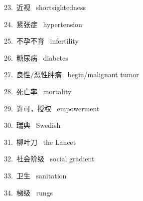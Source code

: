 \documentclass[a4paper, 12pt]{article}
\begin{document}
\begin{multicols}{2}
\begin{flushleft}
23.\ 近视 \ shortsightedness
\end{flushleft}

\begin{flushleft}
24.\ 紧张症 \ hypertension
\end{flushleft}
\end{multicols}

\begin{multicols}{2}
\begin{flushleft}
25.\ 不孕不育 \ infertility
\end{flushleft}

\begin{flushleft}
26.\ 糖尿病 \ diabetes
\end{flushleft}
\end{multicols}

\begin{multicols}{2}
\begin{flushleft}
27.\ 良性/恶性肿瘤 \ begin/malignant tumor
\end{flushleft}

\begin{flushleft}
28.\ 死亡率 \ mortality
\end{flushleft}
\end{multicols}

\begin{multicols}{2}
\begin{flushleft}
29.\ 许可，授权 \ empowerment
\end{flushleft}

\begin{flushleft}
30.\ 瑞典 \ Swedish
\end{flushleft}
\end{multicols}

\begin{multicols}{2}
\begin{flushleft}
31.\ 柳叶刀 \ the Lancet
\end{flushleft}

\begin{flushleft}
32.\ 社会阶级 \ social gradient
\end{flushleft}
\end{multicols}

\begin{multicols}{2}
\begin{flushleft}
33.\ 卫生 \ sanitation
\end{flushleft}

\begin{flushleft}
34.\ 梯级 \ rungs
\end{flushleft}
\end{multicols}
\end{document}
